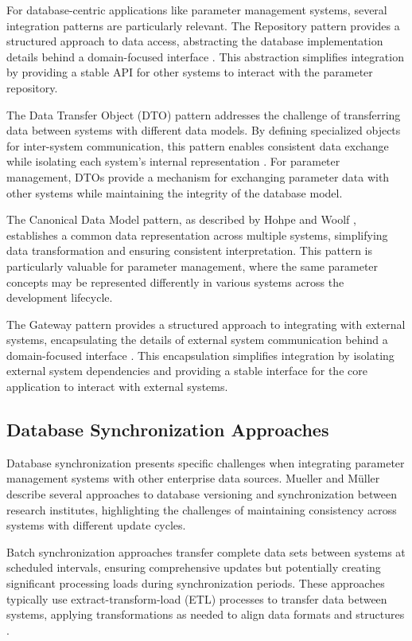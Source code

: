 For database-centric applications like parameter management systems, several integration patterns are particularly relevant. The Repository pattern provides a structured approach to data access, abstracting the database implementation details behind a domain-focused interface \cite{fowler2003patterns}. This abstraction simplifies integration by providing a stable API for other systems to interact with the parameter repository.

The Data Transfer Object (DTO) pattern addresses the challenge of transferring data between systems with different data models. By defining specialized objects for inter-system communication, this pattern enables consistent data exchange while isolating each system's internal representation \cite{fowler2003patterns}. For parameter management, DTOs provide a mechanism for exchanging parameter data with other systems while maintaining the integrity of the database model.

The Canonical Data Model pattern, as described by Hohpe and Woolf \cite{hohpe2002enterprise}, establishes a common data representation across multiple systems, simplifying data transformation and ensuring consistent interpretation. This pattern is particularly valuable for parameter management, where the same parameter concepts may be represented differently in various systems across the development lifecycle.

The Gateway pattern provides a structured approach to integrating with external systems, encapsulating the details of external system communication behind a domain-focused interface \cite{fowler2003patterns}. This encapsulation simplifies integration by isolating external system dependencies and providing a stable interface for the core application to interact with external systems.

\subsection{Database Synchronization Approaches}
\label{subsec:database-synchronization}

Database synchronization presents specific challenges when integrating parameter management systems with other enterprise data sources. Mueller and Müller \cite{mueller2018conception} describe several approaches to database versioning and synchronization between research institutes, highlighting the challenges of maintaining consistency across systems with different update cycles.

Batch synchronization approaches transfer complete data sets between systems at scheduled intervals, ensuring comprehensive updates but potentially creating significant processing loads during synchronization periods. These approaches typically use extract-transform-load (ETL) processes to transfer data between systems, applying transformations as needed to align data formats and structures \cite{williams2004web}.

